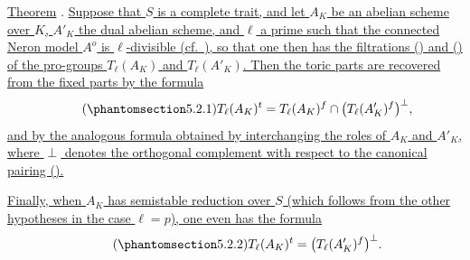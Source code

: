 
\medskip
\noindent
\underline{Theorem} . \underline{Suppose that $S$ is a complete
trait, and let $A_K$ be an abelian scheme over $K$, $A'_K$ the dual
abelian scheme, and $\ell$ a prime such that the connected Neron model
$A^o$ is $\ell$-divisible (cf.\ ), so that one then has the
filtrations () and () of the pro-groups
$T_\ell(A_K)$ and $T_\ell(A'_K)$.  Then the toric parts are
recovered from the fixed parts by the formula}
\begin{equation}\tag{\SGARefTarget{sga7.sga7i.eix.n5-2-1}{5.2.1}}
 T_\ell(A_K)^t
 =
 T_\ell(A_K)^f\cap\bigl(T_\ell(A'_K)^f\bigr)^\perp,
\end{equation}
\underline{and by the analogous formula obtained by interchanging the
roles of $A_K$ and $A'_K$, where $\perp$ denotes the orthogonal
complement with respect to the canonical pairing ().}

\underline{Finally, when $A_K$ has semistable reduction over $S$
(which follows from the other hypotheses in the case $\ell=p$), one
even has the formula}
\begin{equation}\tag{\SGARefTarget{sga7.sga7i.eix.n5-2-2}{5.2.2}}
 T_\ell(A_K)^t=\bigl(T_\ell(A'_K)^f\bigr)^\perp.
\end{equation}

